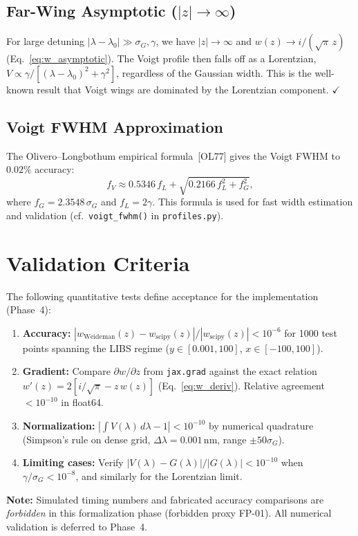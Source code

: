 \documentclass[11pt]{article}
\newcommand{\wfn}{w}  %
\begin{document}
\subsection{Far-Wing Asymptotic ($|z| \to \infty$)}

For large detuning $|\lambda - \lambda_0| \gg \sigma_G, \gamma$, we have $|z| \to \infty$
and $\wfn(z) \to i/(\sqrt{\pi}\,z)$ (Eq.~\ref{eq:w_asymptotic}). The Voigt profile then
falls off as a Lorentzian, $V \propto \gamma / [(\lambda - \lambda_0)^2 + \gamma^2]$,
regardless of the Gaussian width. This is the well-known result that Voigt wings
are dominated by the Lorentzian component. $\checkmark$


\subsection{Voigt FWHM Approximation}

The Olivero--Longbothum empirical formula~[OL77] gives the Voigt FWHM to $0.02\%$ accuracy:
\begin{equation}
  \boxed{f_V \approx 0.5346\,f_L + \sqrt{0.2166\,f_L^2 + f_G^2},}
  \label{eq:voigt_fwhm}
\end{equation}
where $f_G = 2.3548\,\sigma_G$ and $f_L = 2\gamma$. This formula is used for
fast width estimation and validation (cf.\ \texttt{voigt\_fwhm()} in \texttt{profiles.py}).


\section{Validation Criteria}
\label{sec:validation}

The following quantitative tests define acceptance for the implementation (Phase~4):

\begin{enumerate}
  \item \textbf{Accuracy:}
    $|\wfn_{\text{Weideman}}(z) - \wfn_{\text{scipy}}(z)| / |\wfn_{\text{scipy}}(z)| < 10^{-6}$
    for 1000 test points spanning the LIBS regime
    ($y \in [0.001, 100]$, $x \in [-100, 100]$).

  \item \textbf{Gradient:}
    Compare $\partial \wfn / \partial z$ from \texttt{jax.grad} against the exact relation
    $\wfn'(z) = 2[i/\sqrt{\pi} - z\,\wfn(z)]$ (Eq.~\ref{eq:w_deriv}).
    Relative agreement $< 10^{-10}$ in float64.

  \item \textbf{Normalization:}
    $\left|\int V(\lambda)\,d\lambda - 1\right| < 10^{-10}$
    by numerical quadrature (Simpson's rule on dense grid, $\Delta\lambda = 0.001$\,nm,
    range $\pm 50\sigma_G$).

  \item \textbf{Limiting cases:}
    Verify $|V(\lambda) - G(\lambda)|/|G(\lambda)| < 10^{-10}$
    when $\gamma/\sigma_G < 10^{-8}$, and similarly for the Lorentzian limit.
\end{enumerate}

\textbf{Note:} Simulated timing numbers and fabricated accuracy comparisons are
\emph{forbidden} in this formalization phase (forbidden proxy FP-01).
All numerical validation is deferred to Phase~4.
\end{document}

